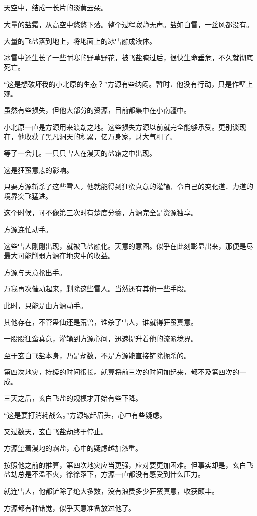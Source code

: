 \begin{this_body}
天空中，结成一长片的淡黄云朵。

大量的盐霜，从高空中悠悠下落。整个过程寂静无声。盐如白雪，一丝风都没有。

大量的飞盐落到地上，将地面上的冰雪融成液体。

冰雪中还生长了一些耐寒的野草野花，被飞盐腌过后，很快生命垂危，不久就彻底死亡。

“这是想破坏我的小北原的生态？”方源有些纳闷。暂时，他没有行动，只是作壁上观。

虽然有些损失，但他大部分的资源，目前都集中在小南疆中。

小北原一直是方源用来渡劫之地。这些损失方源以前就完全能够承受。更别谈现在，他收获了黑凡洞天的积累，亿万身家，财大气粗了。

等了一会儿。一只只雪人在漫天的盐霜之中出现。

这是狂蛮意志的影响。

只要方源斩杀了这些雪人，他就能得到狂蛮真意的灌输，令自己的变化道、力道的境界突飞猛进。

这个时候，可不像第三次时有楚度分羹，方源完全是资源独享。

方源连忙动手。

这些雪人刚刚出现，就被飞盐融化。天意的意图。似乎在此刻彰显出来，那便是尽最大可能削弱方源在地灾中的收益。

方源与天意抢出手。

万我再次催动起来，剿除这些雪人。当然还有其他一些手段。

此时，只能是由方源动手。

其他存在，不管蛊仙还是荒兽，谁杀了雪人，谁就得狂蛮真意。

一股股狂蛮真意，灌输到方源心间，迅速提升着他的流派境界。

至于玄白飞盐本身，乃是劫数，不是方源能直接铲除扼杀的。

第四次地灾，持续的时间很长。就算将前三次的时间加起来，都不及第四次的一成。

三天之后，玄白飞盐的规模才开始有些下降。

“这是要打消耗战么。”方源皱起眉头，心中有些疑虑。

又过数天，玄白飞盐劫终于停止。

方源望着漫地的霜盐，心中的疑虑越加浓重。

按照他之前的推算，第四次地灾应当更强，应对要更加困难。但事实却是，玄白飞盐劫总是不温不火，徐徐落下，方源一直都没有感受到什么压力。

就连雪人，他都铲除了绝大多数，没有浪费多少狂蛮真意，收获颇丰。

方源都有种错觉，似乎天意准备放过他了。


\end{this_body}
